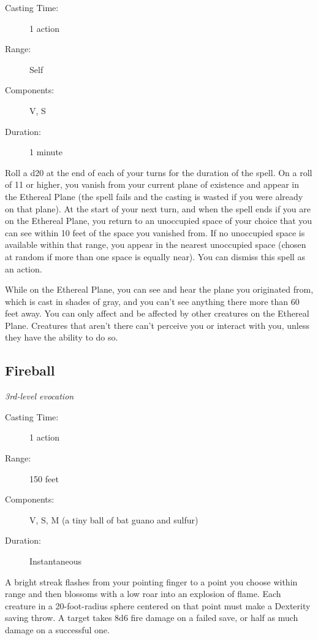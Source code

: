 \documentclass[letterpaper,10pt,twoside,twocolumn,openany]{book}
\begin{document}
\begin{description}
	\item[Casting Time:] 1 action
	\item[Range:] Self 
	\item[Components:] V, S
	\item[Duration:] 1 minute
\end{description}

Roll a d20 at the end of each of your turns for the duration of the spell. On a roll of 11 or higher, you vanish from your current plane of existence and appear in the Ethereal Plane (the spell fails and the casting is wasted if you were already on that plane). At the start of your next turn, and when the spell ends if you are on the Ethereal Plane, you return to an unoccupied space of your choice that you can see within 10 feet of the space you vanished from. If no unoccupied space is available within that range, you appear in the nearest unoccupied space (chosen at random if more than one space is equally near). You can dismiss this spell as an action.

While on the Ethereal Plane, you can see and hear the plane you originated from, which is cast in shades of gray, and you can't see anything there more than 60 feet away. You can only affect and be affected by other creatures on the Ethereal Plane. Creatures that aren't there can't perceive you or interact with you, unless they have the ability to do so. 

\subsection{Fireball} \hypertarget{Fireball}{}
\begin{hangingpar}
	\textit{3rd-level evocation}
\end{hangingpar}

\begin{description}
	\item[Casting Time:] 1 action
	\item[Range:] 150 feet 
	\item[Components:] V, S, M (a tiny ball of bat guano and sulfur) 
	\item[Duration:] Instantaneous 
\end{description}

A bright streak flashes from your pointing finger to a point you choose within range and then blossoms with a low roar into an explosion of flame. Each creature in a 20-foot-radius sphere centered on that point must make a Dexterity saving throw. A target takes 8d6 fire damage on a failed save, or half as much damage on a successful one.
\end{document}
